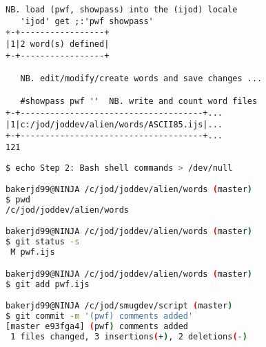 \begin{enumerate}
\begin{lstlisting}[frame=single,framerule=0pt,basicstyle=\ttfamily\footnotesize]
   NB. load (pwf, showpass) into the (ijod) locale
   'ijod' get ;:'pwf showpass'
+-+-----------------+
|1|2 word(s) defined|
+-+-----------------+

   NB. edit/modify/create words and save changes ...

   #showpass pwf ''  NB. write and count word files
+-+-------------------------------------+...
|1|c:/jod/joddev/alien/words/ASCII85.ijs|...
+-+-------------------------------------+...
121
\end{lstlisting}

\begin{lstlisting}[language=bash,frame=single,framerule=0pt
,basicstyle=\ttfamily\footnotesize,backgroundcolor=\color{CodeBackGround}]
$ echo Step 2: Bash shell commands > /dev/null

bakerjd99@NINJA /c/jod/joddev/alien/words (master)
$ pwd
/c/jod/joddev/alien/words

bakerjd99@NINJA /c/jod/joddev/alien/words (master)
$ git status -s
 M pwf.ijs

bakerjd99@NINJA /c/jod/joddev/alien/words (master)
$ git add pwf.ijs

bakerjd99@NINJA /c/jod/smugdev/script (master)
$ git commit -m '(pwf) comments added'
[master e93fga4] (pwf) comments added
 1 files changed, 3 insertions(+), 2 deletions(-)
\end{lstlisting}







\end{enumerate}  